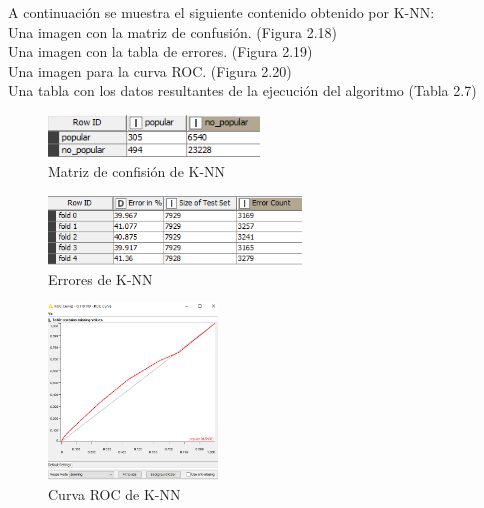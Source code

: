 	A continuación se muestra el siguiente contenido obtenido por K-NN:	\\
	Una imagen con la matriz de confusión. (Figura 2.18) \\
	Una imagen con la tabla de errores. (Figura 2.19) \\
	Una imagen para la curva ROC. (Figura 2.20)	\\
	Una tabla con los datos resultantes de la ejecución del algoritmo (Tabla 2.7)\\

	\begin{figure}[htb]
		\centering
		\includegraphics[width=0.5\textwidth]{./imagenes/23}
		\caption{Matriz de confisión de K-NN} \label{fig:2}
	\end{figure}

	\begin{figure}[htb]
		\centering
		\includegraphics[width=0.6\textwidth]{./imagenes/24}
		\caption{Errores de K-NN} \label{fig:2}
	\end{figure}

	\begin{figure}[htb]
		\centering
		\includegraphics[width=0.4\textwidth]{./imagenes/25}
		\caption{Curva ROC de K-NN} \label{fig:1}
	\end{figure}


